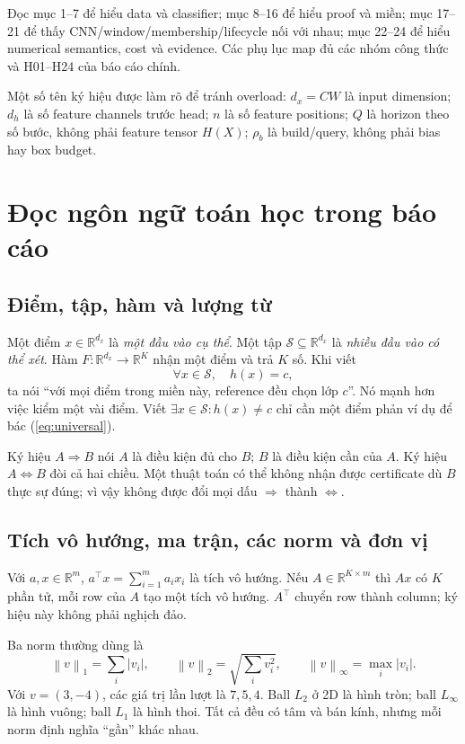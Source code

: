\documentclass[11pt,a4paper]{article}
\newcommand{\R}{\mathbb R}
\newcommand{\norm}[1]{\left\lVert#1\right\rVert}
\newcommand{\Sset}{\mathcal S}
\theoremstyle{definition}
\begin{document}
Đọc mục 1--7 để hiểu data và classifier; mục 8--16 để hiểu proof và miền;
mục 17--21 để thấy CNN/window/membership/lifecycle nối với nhau; mục
22--24 để hiểu numerical semantics, cost và evidence. Các phụ lục map đủ
các nhóm công thức và H01--H24 của báo cáo chính.

Một số tên ký hiệu được làm rõ để tránh overload: $d_x=CW$ là input
dimension; $d_h$ là số feature channels trước head; $n$ là số feature
positions; $Q$ là horizon theo số bước, không phải feature tensor $H(X)$;
$\rho_b$ là build/query, không phải bias hay box budget.

\begingroup
\small
\setlength{\parskip}{0pt}
\tableofcontents
\endgroup
\clearpage

\section{Đọc ngôn ngữ toán học trong báo cáo}
\subsection{Điểm, tập, hàm và lượng từ}
Một điểm $x\in\R^{d_x}$ là \emph{một đầu vào cụ thể}. Một tập
$\Sset\subseteq\R^{d_x}$ là \emph{nhiều đầu vào có thể xét}. Hàm
$F:\R^{d_x}\to\R^K$ nhận một điểm và trả $K$ số. Khi viết
\begin{equation}
\forall x\in\Sset,\quad h(x)=c,
\label{eq:universal}
\end{equation}
ta nói ``với mọi điểm trong miền này, reference đều chọn lớp $c$''. Nó
mạnh hơn việc kiểm một vài điểm. Viết $\exists x\in\Sset:h(x)\ne c$ chỉ cần
một điểm phản ví dụ để bác (\ref{eq:universal}).

Ký hiệu $A\Rightarrow B$ nói $A$ là điều kiện đủ cho $B$; $B$ là điều kiện
cần của $A$. Ký hiệu $A\Leftrightarrow B$ đòi cả hai chiều. Một thuật toán
có thể không nhận được certificate dù $B$ thực sự đúng; vì vậy không được
đổi mọi dấu $\Rightarrow$ thành $\Leftrightarrow$.

\subsection{Tích vô hướng, ma trận, các norm và đơn vị}
Với $a,x\in\R^m$, $a^\top x=\sum_{i=1}^m a_ix_i$ là tích vô hướng.
Nếu $A\in\R^{K\times m}$ thì $Ax$ có $K$ phần tử, mỗi row của $A$ tạo một
tích vô hướng. $A^\top$ chuyển row thành column; ký hiệu này không phải
nghịch đảo.

Ba norm thường dùng là
\begin{equation}
\norm{v}_1=\sum_i|v_i|,\qquad
\norm{v}_2=\sqrt{\sum_i v_i^2},\qquad
\norm{v}_\infty=\max_i|v_i|.
\end{equation}
Với $v=(3,-4)$, các giá trị lần lượt là $7,5,4$. Ball $L_2$ ở 2D là hình
tròn; ball $L_\infty$ là hình vuông; ball $L_1$ là hình thoi. Tất cả đều
có tâm và bán kính, nhưng mỗi norm định nghĩa ``gần'' khác nhau.
\end{document}
